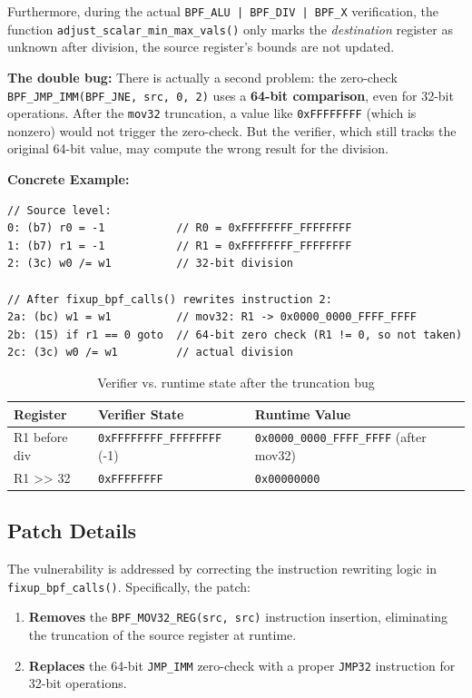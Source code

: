 Furthermore, during the actual \texttt{BPF\_\allowbreak ALU | BPF\_\allowbreak DIV | BPF\_\allowbreak X} verification, the function \texttt{adjust\_\allowbreak scalar\_\allowbreak min\_\allowbreak max\_\allowbreak vals()} only marks the \emph{destination} register as unknown after division, the source register's bounds are not updated.

\textbf{The double bug:}
There is actually a second problem: the zero-check \texttt{BPF\_JMP\_IMM(BPF\_JNE, src, 0, 2)} uses a \textbf{64-bit comparison}, even for 32-bit operations. After the \texttt{mov32} truncation, a value like \texttt{0xFFFFFFFF} (which is nonzero) would not trigger the zero-check. But the verifier, which still tracks the original 64-bit value, may compute the wrong result for the division.

\textbf{Concrete Example:}

\begin{lstlisting}[style=kernel,caption={Bounds mismatch demonstration}]
// Source level:
0: (b7) r0 = -1           // R0 = 0xFFFFFFFF_FFFFFFFF
1: (b7) r1 = -1           // R1 = 0xFFFFFFFF_FFFFFFFF
2: (3c) w0 /= w1          // 32-bit division

// After fixup_bpf_calls() rewrites instruction 2:
2a: (bc) w1 = w1          // mov32: R1 -> 0x0000_0000_FFFF_FFFF
2b: (15) if r1 == 0 goto  // 64-bit zero check (R1 != 0, so not taken)
2c: (3c) w0 /= w1         // actual division
\end{lstlisting}

\begin{table}[H]
\centering
\begin{tabular}{@{}lll@{}}
\toprule
\textbf{Register} & \textbf{Verifier State} & \textbf{Runtime Value} \\
\midrule
R1 before div & \texttt{0xFFFFFFFF\_FFFFFFFF} (-1) & \texttt{0x0000\_0000\_FFFF\_FFFF} (after mov32) \\
R1 >> 32 & \texttt{0xFFFFFFFF} & \texttt{0x00000000} \\
\bottomrule
\end{tabular}
\caption{Verifier vs. runtime state after the truncation bug}
\end{table}

\subsection{Patch Details}

The vulnerability is addressed by correcting the instruction rewriting logic in \texttt{fixup\_bpf\_calls()}. Specifically, the patch:
\begin{enumerate}
    \item \textbf{Removes} the \texttt{BPF\_MOV32\_REG(src, src)} instruction insertion, eliminating the truncation of the source register at runtime.
    \item \textbf{Replaces} the 64-bit \texttt{JMP\_IMM} zero-check with a proper \texttt{JMP32} instruction for 32-bit operations.
\end{enumerate}


